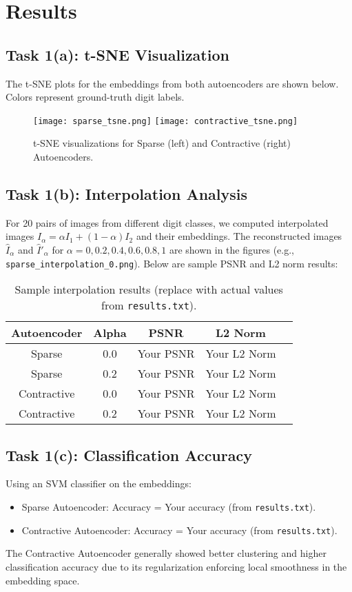 \documentclass[a4paper,12pt]{article}
\begin{document}
\section{Results}
\subsection{Task 1(a): t-SNE Visualization}
The t-SNE plots for the embeddings from both autoencoders are shown below. Colors represent ground-truth digit labels.

\begin{figure}[h]
    \centering
    \texttt{[image: sparse\_tsne.png]}
    \texttt{[image: contractive\_tsne.png]}
    \caption{t-SNE visualizations for Sparse (left) and Contractive (right) Autoencoders.}
\end{figure}

\subsection{Task 1(b): Interpolation Analysis}
For 20 pairs of images from different digit classes, we computed interpolated images $I_\alpha = \alpha I_1 + (1-\alpha)I_2$ and their embeddings. The reconstructed images $\hat{I}_\alpha$ and $\hat{I}'_\alpha$ for $\alpha = 0, 0.2, 0.4, 0.6, 0.8, 1$ are shown in the figures (e.g., \texttt{sparse_interpolation_0.png}). Below are sample PSNR and L2 norm results:

\begin{table}[h]
    \centering
    \begin{tabular}{c|c|c|c|c}
        \toprule
        \textbf{Autoencoder} & \textbf{Alpha} & \textbf{PSNR} & \textbf{L2 Norm} \\
        \midrule
        Sparse & 0.0 & Your PSNR & Your L2 Norm \\
        Sparse & 0.2 & Your PSNR & Your L2 Norm \\
        Contractive & 0.0 & Your PSNR & Your L2 Norm \\
        Contractive & 0.2 & Your PSNR & Your L2 Norm \\
        \bottomrule
    \end{tabular}
    \caption{Sample interpolation results (replace with actual values from \texttt{results.txt}).}
\end{table}

\subsection{Task 1(c): Classification Accuracy}
Using an SVM classifier on the embeddings:
\begin{itemize}
    \item Sparse Autoencoder: Accuracy = Your accuracy (from \texttt{results.txt}).
    \item Contractive Autoencoder: Accuracy = Your accuracy (from \texttt{results.txt}).
\end{itemize}
The Contractive Autoencoder generally showed better clustering and higher classification accuracy due to its regularization enforcing local smoothness in the embedding space.
\end{document}
